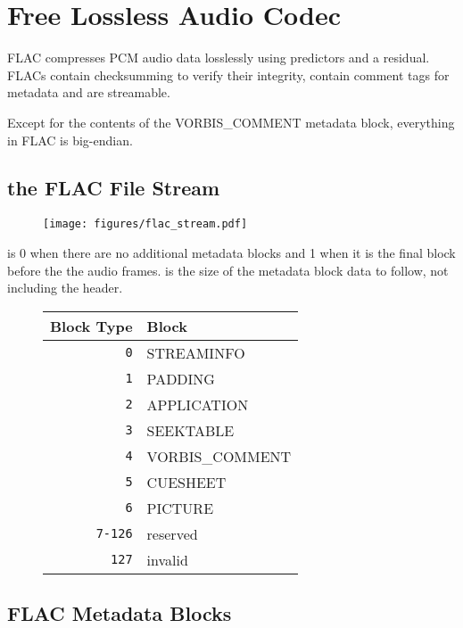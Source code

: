 
\chapter{Free Lossless Audio Codec}
FLAC compresses PCM audio data losslessly using predictors and a
residual.
FLACs contain checksumming to verify their integrity, contain comment tags for
metadata and are streamable.

Except for the contents of the VORBIS\_COMMENT metadata block, everything in FLAC is big-endian.

\section{the FLAC File Stream}
\begin{figure}[h]
\texttt{[image: figures/flac\_stream.pdf]}
\end{figure}
\par
\noindent
{} is 0 when there are no additional metadata blocks and 1 when
it is the final block before the the audio frames.
 is the size of the metadata block data to follow,
not including the header.
\begin{figure}[h]
\begin{tabular}{| r | l |}
\hline
Block Type & Block \\
\hline
\texttt{0} & STREAMINFO \\
\texttt{1} & PADDING \\
\texttt{2} & APPLICATION \\
\texttt{3} & SEEKTABLE \\
\texttt{4} & VORBIS\_COMMENT \\
\texttt{5} & CUESHEET \\
\texttt{6} & PICTURE \\
\texttt{7-126} & reserved \\
\texttt{127} & invalid \\
\hline
\end{tabular}
\end{figure}

\pagebreak

\section{FLAC Metadata Blocks}

